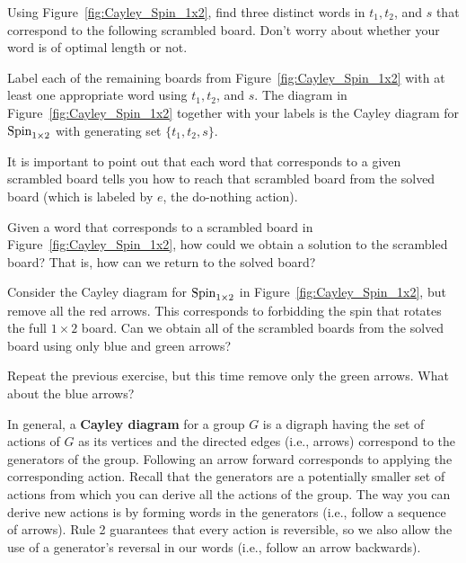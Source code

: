 \begin{exercise}
Using Figure~\ref{fig:Cayley_Spin_1x2}, find three distinct words in $t_1, t_2$, and $s$ that correspond to the following scrambled board.  Don't worry about whether your word is of optimal length or not.
\begin{center}
\end{center}
\end{exercise}

\begin{exercise}\label{exer:Cayley_Spin_1x2}
Label each of the remaining boards from Figure~\ref{fig:Cayley_Spin_1x2} with at least one appropriate word using $t_1, t_2$, and $s$.  The diagram in Figure~\ref{fig:Cayley_Spin_1x2} together with your labels is the Cayley diagram for $\operatorname{Spin}_{1\times 2}$ with generating set $\{t_1,t_2,s\}$.
\end{exercise}

It is important to point out that each word that corresponds to a given scrambled board tells you how to reach that scrambled board from the solved board (which is labeled by $e$, the do-nothing action).

\begin{exercise}
Given a word that corresponds to a scrambled board in Figure~\ref{fig:Cayley_Spin_1x2}, how could we obtain a solution to the scrambled board?  That is, how can we return to the solved board?
\end{exercise}

\begin{exercise}
Consider the Cayley diagram for $\operatorname{Spin}_{1\times 2}$ in Figure~\ref{fig:Cayley_Spin_1x2}, but remove all the red arrows.  This corresponds to forbidding the spin that rotates the full $1\times 2$ board.  Can we obtain all of the scrambled boards from the solved board using only blue and green arrows?
\end{exercise}

\begin{exercise}\label{exer:minimal_Cayley_Spin1by2}
Repeat the previous exercise, but this time remove only the green arrows.  What about the blue arrows?
\end{exercise}

In general, a \textbf{Cayley diagram} for a group $G$ is a digraph having the set of actions of $G$ as its vertices and the directed edges (i.e., arrows) correspond to the generators of the group.  Following an arrow forward corresponds to applying the corresponding action.  Recall that the generators are a potentially smaller set of actions from which you can derive all the actions of the group.  The way you can derive new actions is by forming words in the generators (i.e., follow a sequence of arrows).  Rule 2 guarantees that every action is reversible, so we also allow the use of a generator's reversal in our words (i.e., follow an arrow backwards).

